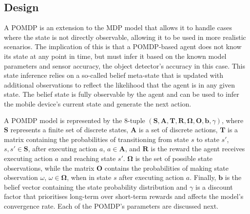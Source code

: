\documentclass[runningheads]{llncs}
\begin{document}


\subsection{Design}

A POMDP is an extension to the MDP model that allows it to handle cases where the state is not directly observable, allowing it to be used in more realistic scenarios. 
The implication of this is that a POMDP-based agent does not know its state at any point in time, but must infer it based on the known model parameters and sensor accuracy, the object detector's accuracy in this case.
This state inference relies on a so-called belief meta-state that is updated with additional observations to reflect the likelihood that the agent is in any given state.
The belief state is fully observable by the agent and can be used to infer the mobile device's current state and generate the next action.

A POMDP model is represented by the 8-tuple $(\mathbf{S}, \mathbf{A}, \mathbf{T}, \mathbf{R}, \mathbf{\Omega}, \mathbf{O}, \mathbf{b}, \gamma)$, where $\mathbf{S}$ represents a finite set of discrete states, $\mathbf{A}$ is a set of discrete actions, $\mathbf{T}$ is a matrix containing the probabilities of transitioning from state $s$ to state $s'$, $s, s' \in \mathbf{S}$, after executing action $a$, $a \in \mathbf{A}$, and $\mathbf{R}$ is the reward the agent receives executing action $a$ and reaching state $s'$.
$\mathbf{\Omega}$ is the set of possible state observations, while the matrix $\mathbf{O}$ contains the probabilities of making state observation $\omega$, $\omega \in \mathbf{\Omega}$, when in state $s$ after executing action $a$.
Finally, $\mathbf{b}$ is the belief vector containing the state probability distribution and $\gamma$ is a discount factor that prioritises long-term over short-term rewards and affects the model's convergence rate. 
Each of the POMDP's parameters are discussed next. 
\end{document}
